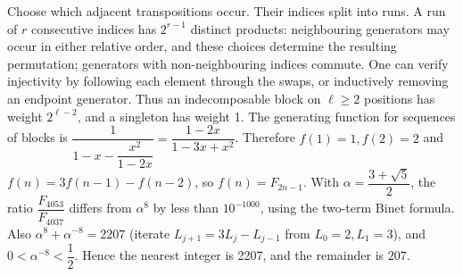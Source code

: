 Choose which adjacent transpositions occur. Their indices split into runs. A run of $r$ consecutive indices has $2^{r-1}$ distinct products: neighbouring generators may occur in either relative order, and these choices determine the resulting permutation; generators with non-neighbouring indices commute. One can verify injectivity by following each element through the swaps, or inductively removing an endpoint generator. Thus an indecomposable block on $\ell\ge2$ positions has weight $2^{\ell-2}$, and a singleton has weight 1. The generating function for sequences of blocks is $\dfrac{1}{1 - x - \dfrac{x^2}{1-2x}} = \dfrac{1-2x}{1-3x+x^2}$. Therefore $f(1)=1,f(2)=2$ and $f(n)=3f(n-1)-f(n-2)$, so $f(n)=F_{2n-1}$. With $\alpha = \dfrac{3+\sqrt5}{2}$, the ratio $\dfrac{F_{4053}}{F_{4037}}$ differs from $\alpha^8$ by less than $10^{-1000}$, using the two-term Binet formula. Also $\alpha^8+\alpha^{-8}=2207$ (iterate $L_{j+1}=3L_j-L_{j-1}$ from $L_0=2,L_1=3$), and $0 < \alpha^{-8} < \dfrac{1}{2}$. Hence the nearest integer is 2207, and the remainder is $\boxed{207}$.

